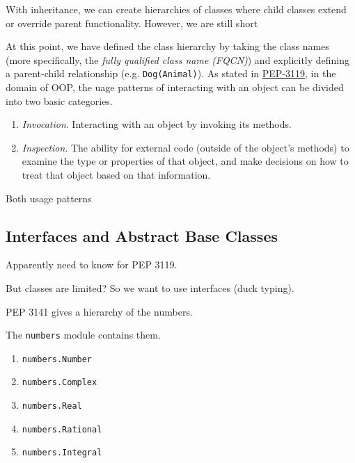   With inheritance, we can create hierarchies of classes where child classes extend or override parent functionality. However, we are still short 

  At this point, we have defined the class hierarchy by taking the class names (more specifically, the \textit{fully qualified class name (FQCN)}) and explicitly defining a parent-child relationship (e.g. \texttt{Dog(Animal)}). As stated in \href{https://peps.python.org/pep-3119/}{PEP-3119}, in the domain of OOP, the uage patterns of interacting with an object can be divided into two basic categories. 
  \begin{enumerate}
    \item \textit{Invocation}. Interacting with an object by invoking its methods. 
    \item \textit{Inspection}. The ability for external code (outside of the object's methods) to examine the type or properties of that object, and make decisions on how to treat that object based on that information. 
  \end{enumerate}
  Both usage patterns 

\subsection{Interfaces and Abstract Base Classes} 

  Apparently need to know for PEP 3119. 

  But classes are limited? So we want to use interfaces (duck typing). 


  PEP 3141 gives a hierarchy of the numbers. 

  \begin{definition}
    \label{def:numeric-abcs}
 
    The \texttt{numbers} module contains them. 
    \begin{enumerate}
      \item \texttt{numbers.Number} 
      \item \texttt{numbers.Complex} 
      \item \texttt{numbers.Real} 
      \item \texttt{numbers.Rational} 
      \item \texttt{numbers.Integral} 
    \end{enumerate}
  \end{definition}

